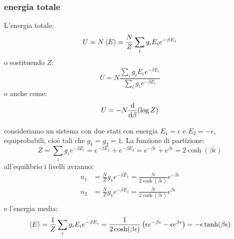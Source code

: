 \subsubsection{energia totale}
L'energia totale:
\begin{equation}
	U=N\left<E\right>=\frac{N}{Z}\sum_i g_i E_ie^{-\beta E_i}
\end{equation}
o sostituendo $Z$:
\begin{equation}
	U=N\frac{\sum_i g_i E_ie^{-\beta E_i}}{\sum_i g_i e^{-\beta E_i}}
\end{equation}
o anche come:
\begin{equation}
	U=-N\frac{\mathrm{d}}{\mathrm{d} \beta}(\log Z)
\end{equation}
\begin{Es}
	consideriamo un sistema con due stati con energia $E_1=\epsilon$ e $E_2=-\epsilon$, equiprobabili, cioè tali che $g_1=g_2=1$. La funzione di partizione:
	\[
		Z=\sum_i g_ie^{-\beta E_i}=e^{-\beta E_1}+e^{-\beta E_2}=e^{-\beta \epsilon}+e^{\beta\epsilon}=2\cosh(\beta\epsilon)
	\]
	all'equilibrio i livelli avranno:
	\[
		\begin{split}
			n_1&=\frac{N}{Z}g_1e^{-\beta E_1}=\frac{N}{2\cosh(\beta\epsilon)}e^{-\beta\epsilon}\\
			n_2&=\frac{N}{Z}g_1e^{-\beta E_2}=\frac{N}{2\cosh(\beta\epsilon)}e^{\beta\epsilon}\\
		\end{split}
	\]
	e l'energia media:
	\[
		\left<E\right>=\frac{1}{Z}\sum_i g_i E_ie^{-\beta E_i}=\frac{1}{2\cosh(\beta\epsilon)}\left(\epsilon e^{-\beta\epsilon}-\epsilon e^{\beta \epsilon}\right)=-\epsilon\tanh(\beta\epsilon)
	\]
\end{Es}
